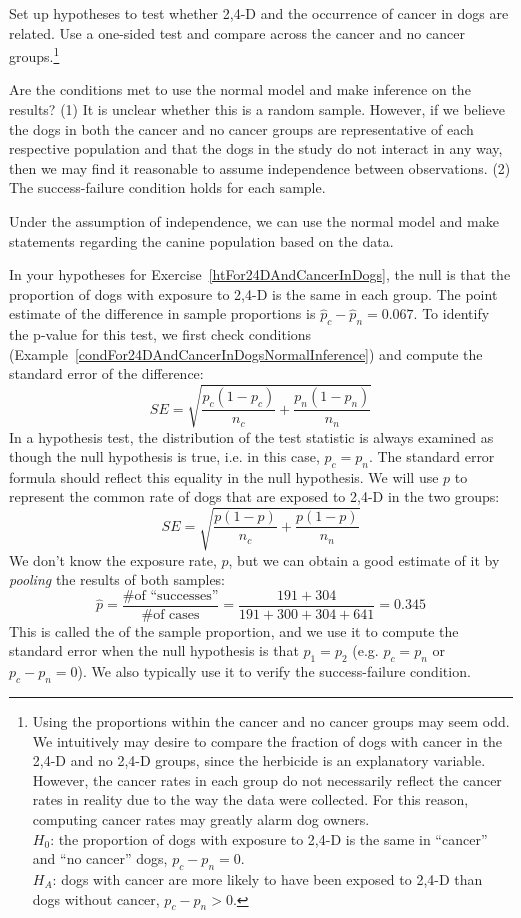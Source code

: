 \begin{exercise} \label{htFor24DAndCancerInDogs}
Set up hypotheses to test whether 2,4-D and the occurrence of cancer in dogs are related. Use a one-sided test and compare across the cancer and no cancer groups.\footnote{Using the proportions within the cancer and no cancer groups may seem odd. We intuitively may desire to compare the fraction of dogs with cancer in the 2,4-D and no 2,4-D groups, since the herbicide is an explanatory variable. However, the cancer rates in each group do not necessarily reflect the cancer rates in reality due to the way the data were collected. For this reason, computing cancer rates may greatly alarm dog owners. \\ $H_0$: the proportion of dogs with exposure to 2,4-D is the same in ``cancer'' and ``no cancer'' dogs, $p_c - p_n = 0$. \\ $H_A$: dogs with cancer are more likely to have been exposed to 2,4-D than dogs without cancer, $p_c - p_n > 0$.}
\end{exercise}

\textB{\newpage}

\begin{example}{Are the conditions met to use the normal model and make inference on the results?}\label{condFor24DAndCancerInDogsNormalInference}
(1) It is unclear whether this is a random sample. However, if we believe the dogs in both the cancer and no cancer groups are representative of each respective population and that the dogs in the study do not interact in any way, then we may find it reasonable to assume independence between observations. (2) The success-failure condition holds for each sample.

Under the assumption of independence, we can use the normal model and make statements regarding the canine population based on the data.
\end{example}

In your hypotheses for Exercise~\ref{htFor24DAndCancerInDogs}, the null is that the proportion of dogs with exposure to 2,4-D is the same in each group. The point estimate of the difference in sample proportions is $\hat{p}_c - \hat{p}_n = 0.067$. To identify the p-value for this test, we first check conditions (Example~\ref{condFor24DAndCancerInDogsNormalInference}) and compute the standard error of the difference:
$$SE = \sqrt{\frac{p_c(1-p_c)}{n_c} + \frac{p_n(1-p_n)}{n_n}}$$
In a hypothesis test, the distribution of the test statistic is always examined as though the null hypothesis is true, i.e. in this case, $p_c = p_n$. The standard error formula should reflect this equality in the null hypothesis. We will use $p$ to represent the common rate of dogs that are exposed to 2,4-D in the two groups:
$$SE = \sqrt{\frac{p(1-p)}{n_c} + \frac{p(1-p)}{n_n}}$$
We don't know the exposure rate, $p$, but we can obtain a good estimate of it by \emph{pooling} the results of both samples:
$$\hat{p} = \frac{\text{\# of ``successes''}}{\text{\# of cases}} = \frac{191 + 304}{191+300+304+641} = 0.345$$
This is called the  of the sample proportion, and we use it to compute the standard error when the null hypothesis is that $p_1 = p_2$ (e.g. $p_c = p_n$ or $p_c - p_n = 0$). We also typically use it to verify the success-failure condition.

